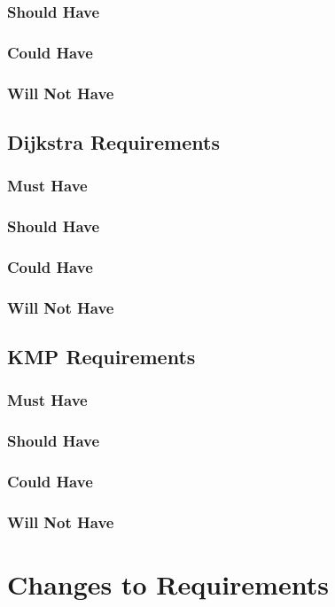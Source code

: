 \documentclass{l4proj}
\begin{document}
\subsubsection{Should Have}
\subsubsection{Could Have}
\subsubsection{Will Not Have}
\subsection{Dijkstra Requirements}
\subsubsection{Must Have}
\subsubsection{Should Have}
\subsubsection{Could Have}
\subsubsection{Will Not Have}
\subsection{KMP Requirements}
\subsubsection{Must Have}
\subsubsection{Should Have}
\subsubsection{Could Have}
\subsubsection{Will Not Have}
\section{Changes to Requirements}
\end{document}
